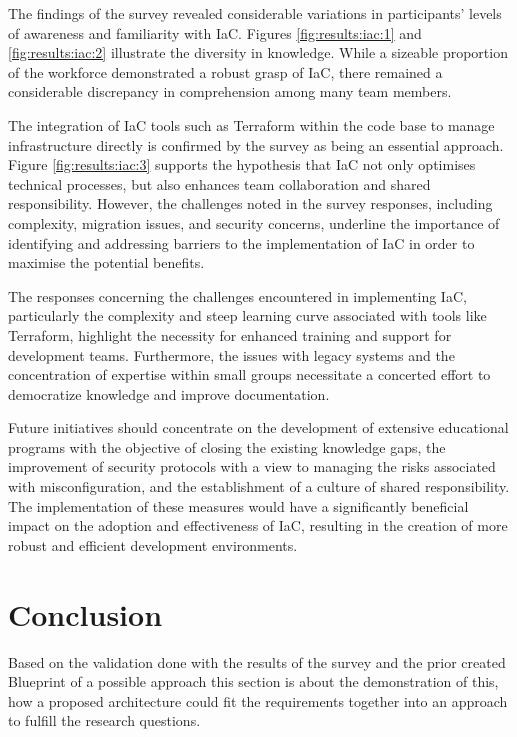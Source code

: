 The findings of the survey revealed considerable variations in participants' levels of awareness and familiarity with \ac{IaC}. Figures \ref{fig:results:iac:1} and \ref{fig:results:iac:2} illustrate the diversity in knowledge. While a sizeable proportion of the workforce demonstrated a robust grasp of \ac{IaC}, there remained a considerable discrepancy in comprehension among many team members.

The integration of \ac{IaC} tools such as Terraform within the code base to manage infrastructure directly is confirmed by the survey as being an essential approach. Figure \ref{fig:results:iac:3} supports the hypothesis that \ac{IaC} not only optimises technical processes, but also enhances team collaboration and shared responsibility. However, the challenges noted in the survey responses, including complexity, migration issues, and security concerns, underline the importance of identifying and addressing barriers to the implementation of \ac{IaC} in order to maximise the potential benefits.

The responses concerning the challenges encountered in implementing \ac{IaC}, particularly the complexity and steep learning curve associated with tools like Terraform, highlight the necessity for enhanced training and support for development teams. Furthermore, the issues with legacy systems and the concentration of expertise within small groups necessitate a concerted effort to democratize knowledge and improve documentation.

Future initiatives should concentrate on the development of extensive educational programs with the objective of closing the existing knowledge gaps, the improvement of security protocols with a view to managing the risks associated with misconfiguration, and the establishment of a culture of shared responsibility. The implementation of these measures would have a significantly beneficial impact on the adoption and effectiveness of \ac{IaC}, resulting in the creation of more robust and efficient development environments.

\section{Conclusion}
Based on the validation done with the results of the survey and the prior created Blueprint of a possible approach this section is about the demonstration of this, how a proposed architecture could fit the requirements together into an approach to fulfill the research questions.

